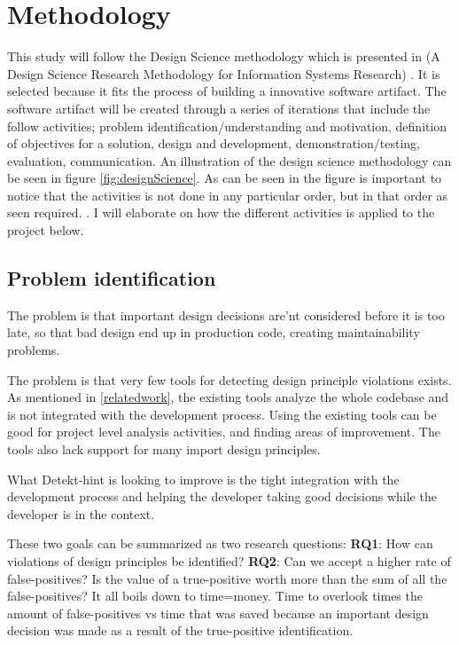 \documentclass{article}
\begin{document}
\section{Methodology}
\label{methodology}
This study will follow the Design Science methodology which is presented in (A Design Science Research Methodology for Information Systems Research) \cite{10.2753/MIS0742-1222240302}. It is selected because it fits the process of building a innovative software artifact. The software artifact will be created through a series of iterations that include the follow activities; problem identification/understanding and motivation, definition of objectives for a solution, design and development, demonstration/testing, evaluation, communication.  An illustration of the design science methodology can be seen in figure \ref{fig:designScience}. As can be seen in the figure is important to notice that the activities is not done in any particular order, but in that order as seen required.  . I will elaborate on how the different activities is applied to the project below. 

\subsection{Problem identification}
The problem is that important design decisions are'nt considered before it is too late, so that bad design end up in production code, creating maintainability problems.


The problem is that very few tools for detecting design principle violations exists. As mentioned in \ref{relatedwork}, the existing tools analyze the whole codebase and is not integrated with the development process. Using the existing tools can be good for project level analysis activities, and finding areas of improvement. The tools also lack support for many import design principles.


What Detekt-hint is looking to improve is the tight integration with the development process and helping the developer taking good decisions while the developer is in the context.


\hfill \newline
These two goals can be summarized as two research questions:
\hfill \newline
\hfill \newline
\textbf{RQ1}: How can violations of design principles be identified? \newline
\textbf{RQ2}: Can we accept a higher rate of false-positives? \newline
Is the value of a true-positive worth more than the sum of all the false-positives? It all boils down to time=money. Time to overlook times the amount of false-positives vs time that was saved because an important design decision was made as a result of the true-positive identification.
\end{document}
